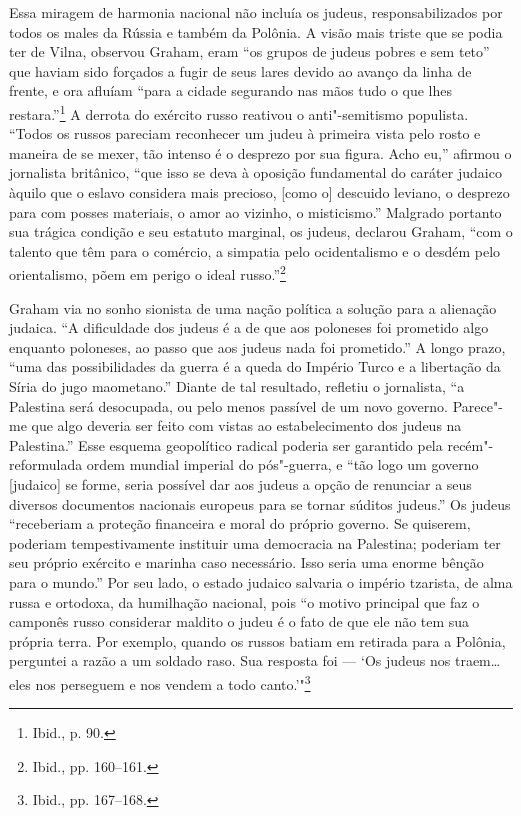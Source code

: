 %

Essa miragem de harmonia nacional não incluía os judeus,
responsabilizados por todos os males da Rússia e também da Polônia. A
visão mais triste que se podia ter de Vilna, observou Graham, eram ``os
grupos de judeus pobres e sem teto'' que haviam sido forçados a fugir de
seus lares devido ao avanço da linha de frente, e ora afluíam ``para a
cidade segurando nas mãos tudo o que lhes restara.''\footnote{Ibid., p. 90.} A derrota do exército russo reativou o anti"-semitismo populista. ``Todos os russos pareciam reconhecer um judeu à primeira vista pelo
rosto e maneira de se mexer, tão intenso é o desprezo por sua figura.
Acho eu,'' afirmou o jornalista britânico, ``que isso se deva à oposição
fundamental do caráter judaico àquilo que o eslavo considera mais
precioso, {[}como o{]} descuido leviano, o desprezo para com posses
materiais, o amor ao vizinho, o misticismo.'' Malgrado portanto sua
trágica condição e seu estatuto marginal, os judeus, declarou Graham,
``com o talento que têm para o comércio, a simpatia pelo ocidentalismo e
o desdém pelo orientalismo, põem em perigo o ideal russo.''\footnote{Ibid., pp. 160--161.}

Graham via no sonho sionista de uma nação política a solução para a
alienação judaica. ``A dificuldade dos judeus é a de que aos poloneses
foi prometido algo enquanto poloneses, ao passo que aos judeus nada foi
prometido.'' A longo prazo, ``uma das possibilidades da guerra é a queda
do Império Turco e a libertação da Síria do jugo maometano.'' Diante de
tal resultado, refletiu o jornalista, ``a Palestina será desocupada, ou
pelo menos passível de um novo governo. Parece"-me que algo deveria ser
feito com vistas ao estabelecimento dos judeus na Palestina.'' Esse
esquema geopolítico radical poderia ser garantido pela recém"-reformulada
ordem mundial imperial do pós"-guerra, e ``tão logo um governo
{[}judaico{]} se forme, seria possível dar aos judeus a opção de
renunciar a seus diversos documentos nacionais europeus para se tornar
súditos judeus.'' Os judeus ``receberiam a proteção financeira e moral
do próprio governo. Se quiserem, poderiam tempestivamente instituir uma
democracia na Palestina; poderiam ter seu próprio exército e marinha
caso necessário. Isso seria uma enorme bênção para o mundo.'' Por seu
lado, o estado judaico salvaria o império tzarista, de alma russa e
ortodoxa, da humilhação nacional, pois ``o motivo principal que faz o
camponês russo considerar maldito o judeu é o fato de que ele não tem
sua própria terra. Por exemplo, quando os russos batiam em retirada para
a Polônia, perguntei a razão a um soldado raso. Sua resposta foi --- `Os
judeus nos traem\ldots{} eles nos perseguem e nos vendem a todo
canto.'"\footnote{Ibid., pp. 167--168.}

